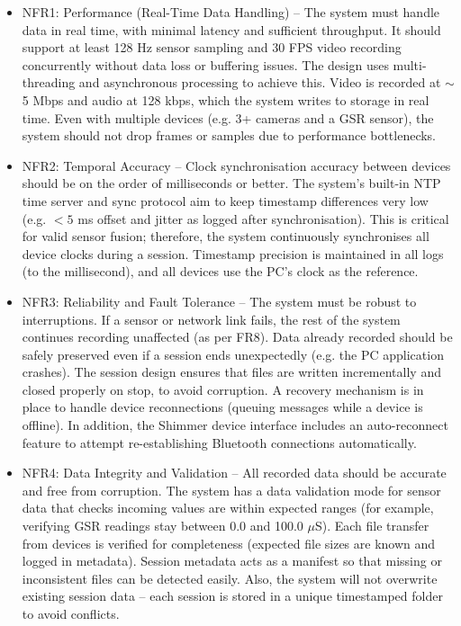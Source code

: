 \begin{itemize}
    \item NFR1: Performance (Real-Time Data Handling) -- The system must handle data in real time, with minimal latency and sufficient throughput. It should support at least 128 Hz sensor sampling and 30 FPS video recording concurrently without data loss or buffering issues. The design uses multi-threading and asynchronous processing to achieve this. Video is recorded at $\sim$5 Mbps and audio at 128 kbps, which the system writes to storage in real time. Even with multiple devices (e.g. 3+ cameras and a GSR sensor), the system should not drop frames or samples due to performance bottlenecks.

    \item NFR2: Temporal Accuracy -- Clock synchronisation accuracy between devices should be on the order of milliseconds or better. The system's built-in NTP time server and sync protocol aim to keep timestamp differences very low (e.g. $<5$ ms offset and jitter as logged after synchronisation). This is critical for valid sensor fusion; therefore, the system continuously synchronises all device clocks during a session. Timestamp precision is maintained in all logs (to the millisecond), and all devices use the PC's clock as the reference.

    \item NFR3: Reliability and Fault Tolerance -- The system must be robust to interruptions. If a sensor or network link fails, the rest of the system continues recording unaffected (as per FR8). Data already recorded should be safely preserved even if a session ends unexpectedly (e.g. the PC application crashes). The session design ensures that files are written incrementally and closed properly on stop, to avoid corruption. A recovery mechanism is in place to handle device reconnections (queuing messages while a device is offline). In addition, the Shimmer device interface includes an auto-reconnect feature to attempt re-establishing Bluetooth connections automatically.

    \item NFR4: Data Integrity and Validation -- All recorded data should be accurate and free from corruption. The system has a data validation mode for sensor data that checks incoming values are within expected ranges (for example, verifying GSR readings stay between 0.0 and 100.0 $\mu$S). Each file transfer from devices is verified for completeness (expected file sizes are known and logged in metadata). Session metadata acts as a manifest so that missing or inconsistent files can be detected easily. Also, the system will not overwrite existing session data -- each session is stored in a unique timestamped folder to avoid conflicts.


\end{itemize}
